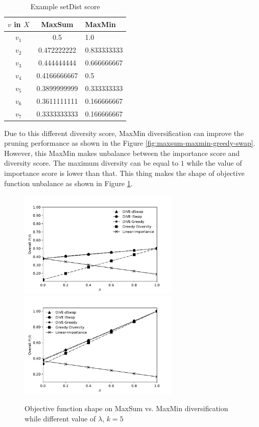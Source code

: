 \documentclass{article}
\begin{document}
\begin{table}
	\begin{center}
		\caption{Example setDist score}
		\label{tab:setDist-score}
		\begin{tabular}{ccl}
			\toprule
			$ v $ in $ X $ &MaxSum &MaxMin\\
			\midrule
			$ v_1 $ & 0.5 & 1.0\\
			$ v_2 $ & 0.472222222 & 0.833333333\\
			$ v_3 $ & 0.444444444 & 0.666666667\\
			$ v_4 $ & 0.4166666667 & 0.5\\
			$ v_5 $ & 0.3899999999 & 0.333333333\\
			$ v_6 $ & 0.3611111111 & 0.166666667\\
			$ v_7 $ & 0.3333333333 & 0.166666667\\
			\bottomrule
		\end{tabular}
	\end{center}
\end{table}


Due to this different diversity score, MaxMin diversification can improve the pruning performance as shown in the Figure \ref{fig:maxsum-maxmin-greedy-swap}. However, this MaxMin makes unbalance between the importance score and diversity score. The maximum diversity can be equal to $ 1 $ while the value of importance score is lower than that. This thing makes the shape of objective function unbalance as shown in Figure \ref{fig:Objective-function-maxsum-maxmin}.
\begin{figure}
	\begin{center}
		\includegraphics[width=3.0in]{figures/1_tradeoff_June_objf_disease_maxSUM}
		\includegraphics[width=3.0in]{figures/1_tradeoff_June_objf_disease_MaxMIN}
		\caption{Objective function shape on MaxSum vs. MaxMin diversification while different value of $\lambda$, $k = 5$}
		\label{fig:Objective-function-maxsum-maxmin}
	\end{center}
\end{figure}
\end{document}
